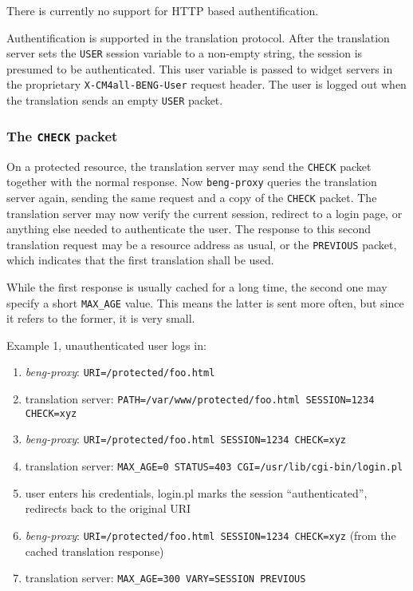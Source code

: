 \documentclass[a4paper,12pt]{article}
\begin{document}
There is currently no support for HTTP based authentification.

Authentification is supported in the translation protocol.  After the
translation server sets the \verb|USER| session variable to a
non-empty string, the session is presumed to be authenticated.  This
user variable is passed to widget servers in the proprietary
\texttt{X-CM4all-BENG-User} request header.  The user is logged out
when the translation sends an empty \verb|USER| packet.

\subsubsection{The \texttt{CHECK} packet}

On a protected resource, the translation server may send the
\verb|CHECK| packet together with the normal response.  Now
\texttt{beng-proxy} queries the translation server again, sending the
same request and a copy of the \verb|CHECK| packet.  The translation
server may now verify the current session, redirect to a login page,
or anything else needed to authenticate the user.  The response to
this second translation request may be a resource address as usual, or
the \verb|PREVIOUS| packet, which indicates that the first
translation shall be used.

While the first response is usually cached for a long time, the second
one may specify a short \texttt{MAX\_AGE} value.  This means the latter
is sent more often, but since it refers to the former, it is very
small.

Example 1, unauthenticated user logs in:

\begin{enumerate}
\item \emph{beng-proxy}: \texttt{URI=/protected/foo.html}
\item translation server: \texttt{PATH=/var/www/protected/foo.html
  SESSION=1234 CHECK=xyz}
\item \emph{beng-proxy}: \texttt{URI=/protected/foo.html SESSION=1234
  CHECK=xyz}
\item translation server: \texttt{MAX\_AGE=0 STATUS=403
  CGI=/usr/lib/cgi-bin/login.pl}
\item user enters his credentials, login.pl marks the session
  ``authenticated'', redirects back to the original URI
\item \emph{beng-proxy}: \texttt{URI=/protected/foo.html SESSION=1234
  CHECK=xyz} (from the cached translation response)
\item translation server: \texttt{MAX\_AGE=300 VARY=SESSION PREVIOUS}
\end{enumerate}
\end{document}
